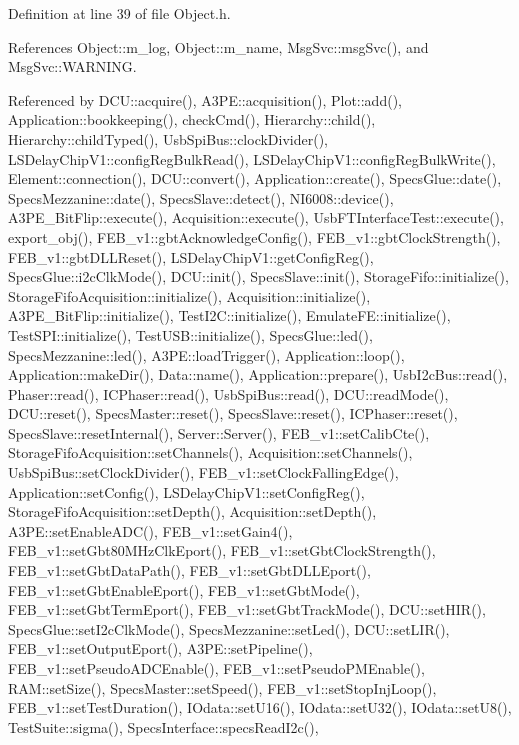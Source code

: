 Definition at line 39 of file Object.\+h.



References Object\+::m\+\_\+log, Object\+::m\+\_\+name, Msg\+Svc\+::msg\+Svc(), and Msg\+Svc\+::\+W\+A\+R\+N\+I\+NG.



Referenced by D\+C\+U\+::acquire(), A3\+P\+E\+::acquisition(), Plot\+::add(), Application\+::bookkeeping(), check\+Cmd(), Hierarchy\+::child(), Hierarchy\+::child\+Typed(), Usb\+Spi\+Bus\+::clock\+Divider(), L\+S\+Delay\+Chip\+V1\+::config\+Reg\+Bulk\+Read(), L\+S\+Delay\+Chip\+V1\+::config\+Reg\+Bulk\+Write(), Element\+::connection(), D\+C\+U\+::convert(), Application\+::create(), Specs\+Glue\+::date(), Specs\+Mezzanine\+::date(), Specs\+Slave\+::detect(), N\+I6008\+::device(), A3\+P\+E\+\_\+\+Bit\+Flip\+::execute(), Acquisition\+::execute(), Usb\+F\+T\+Interface\+Test\+::execute(), export\+\_\+obj(), F\+E\+B\+\_\+v1\+::gbt\+Acknowledge\+Config(), F\+E\+B\+\_\+v1\+::gbt\+Clock\+Strength(), F\+E\+B\+\_\+v1\+::gbt\+D\+L\+L\+Reset(), L\+S\+Delay\+Chip\+V1\+::get\+Config\+Reg(), Specs\+Glue\+::i2c\+Clk\+Mode(), D\+C\+U\+::init(), Specs\+Slave\+::init(), Storage\+Fifo\+::initialize(), Storage\+Fifo\+Acquisition\+::initialize(), Acquisition\+::initialize(), A3\+P\+E\+\_\+\+Bit\+Flip\+::initialize(), Test\+I2\+C\+::initialize(), Emulate\+F\+E\+::initialize(), Test\+S\+P\+I\+::initialize(), Test\+U\+S\+B\+::initialize(), Specs\+Glue\+::led(), Specs\+Mezzanine\+::led(), A3\+P\+E\+::load\+Trigger(), Application\+::loop(), Application\+::make\+Dir(), Data\+::name(), Application\+::prepare(), Usb\+I2c\+Bus\+::read(), Phaser\+::read(), I\+C\+Phaser\+::read(), Usb\+Spi\+Bus\+::read(), D\+C\+U\+::read\+Mode(), D\+C\+U\+::reset(), Specs\+Master\+::reset(), Specs\+Slave\+::reset(), I\+C\+Phaser\+::reset(), Specs\+Slave\+::reset\+Internal(), Server\+::\+Server(), F\+E\+B\+\_\+v1\+::set\+Calib\+Cte(), Storage\+Fifo\+Acquisition\+::set\+Channels(), Acquisition\+::set\+Channels(), Usb\+Spi\+Bus\+::set\+Clock\+Divider(), F\+E\+B\+\_\+v1\+::set\+Clock\+Falling\+Edge(), Application\+::set\+Config(), L\+S\+Delay\+Chip\+V1\+::set\+Config\+Reg(), Storage\+Fifo\+Acquisition\+::set\+Depth(), Acquisition\+::set\+Depth(), A3\+P\+E\+::set\+Enable\+A\+D\+C(), F\+E\+B\+\_\+v1\+::set\+Gain4(), F\+E\+B\+\_\+v1\+::set\+Gbt80\+M\+Hz\+Clk\+Eport(), F\+E\+B\+\_\+v1\+::set\+Gbt\+Clock\+Strength(), F\+E\+B\+\_\+v1\+::set\+Gbt\+Data\+Path(), F\+E\+B\+\_\+v1\+::set\+Gbt\+D\+L\+L\+Eport(), F\+E\+B\+\_\+v1\+::set\+Gbt\+Enable\+Eport(), F\+E\+B\+\_\+v1\+::set\+Gbt\+Mode(), F\+E\+B\+\_\+v1\+::set\+Gbt\+Term\+Eport(), F\+E\+B\+\_\+v1\+::set\+Gbt\+Track\+Mode(), D\+C\+U\+::set\+H\+I\+R(), Specs\+Glue\+::set\+I2c\+Clk\+Mode(), Specs\+Mezzanine\+::set\+Led(), D\+C\+U\+::set\+L\+I\+R(), F\+E\+B\+\_\+v1\+::set\+Output\+Eport(), A3\+P\+E\+::set\+Pipeline(), F\+E\+B\+\_\+v1\+::set\+Pseudo\+A\+D\+C\+Enable(), F\+E\+B\+\_\+v1\+::set\+Pseudo\+P\+M\+Enable(), R\+A\+M\+::set\+Size(), Specs\+Master\+::set\+Speed(), F\+E\+B\+\_\+v1\+::set\+Stop\+Inj\+Loop(), F\+E\+B\+\_\+v1\+::set\+Test\+Duration(), I\+Odata\+::set\+U16(), I\+Odata\+::set\+U32(), I\+Odata\+::set\+U8(), Test\+Suite\+::sigma(), Specs\+Interface\+::specs\+Read\+I2c(), 